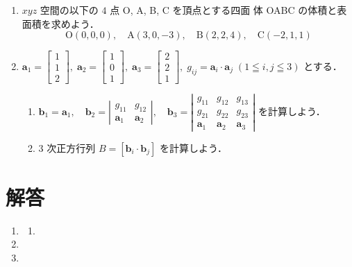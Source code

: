 \documentclass[11pt, uplatex, dvipdfmx]{jsarticle}
\begin{document}
\begin{enumerate}
\item $xyz$ 空間の以下の $4$ 点 O, A, B, C を頂点とする四面
  体 OABC の体積と表面積を求めよう．
  \[
    \textrm{O}(0,0,0), \quad \textrm{A}(3,0,-3), \quad \textrm{B}(2,2,4), \quad \textrm{C}(-2,1,1)
  \]


\item $\bm{a}_1=\left[
    \begin{array}{r}
      1\\
      1\\
      2
    \end{array}
  \right], \; \bm{a}_2=\left[
    \begin{array}{r}
      1\\
      0\\
      1
    \end{array}
  \right], \; \bm{a}_3=\left[
    \begin{array}{r}
      2\\
      2\\
      1
    \end{array}
  \right], \; g_{ij} = \bm{a}_i \cdot \bm{a}_j \; (1 \leqq i,j \leqq 3)$ とする．

  \vspace{1zh}

  \begin{enumerate}[(1)]
    \setlength{\itemsep}{1ex}
    
  \item $\bm{b}_1 = \bm{a}_1, \quad \bm{b}_2= \left|
      \begin{array}{cc}
        g_{11} & g_{12}\\
        \bm{a}_1 & \bm{a}_2
      \end{array}
    \right|, \quad \bm{b}_3 = \left|
      \begin{array}{ccc}
        g_{11} & g_{12} & g_{13}\\
        g_{21} & g_{22} & g_{23}\\
        \bm{a}_1 & \bm{a}_2 & \bm{a}_3
      \end{array}
    \right|$ を計算しよう．

  \item $3$ 次正方行列 $B=\left[ \bm{b}_i \cdot \bm{b}_j\right]$ を計算しよう．
  \end{enumerate}
\end{enumerate}

\newpage

\section*{解答}

\begin{enumerate}
  \setlength{\itemsep}{1ex}
  
\item
  \begin{enumerate}[(1)]
    \setlength{\itemsep}{1ex}
    
  \item 
  \end{enumerate}

\item

\item
\end{enumerate}
\end{document}
